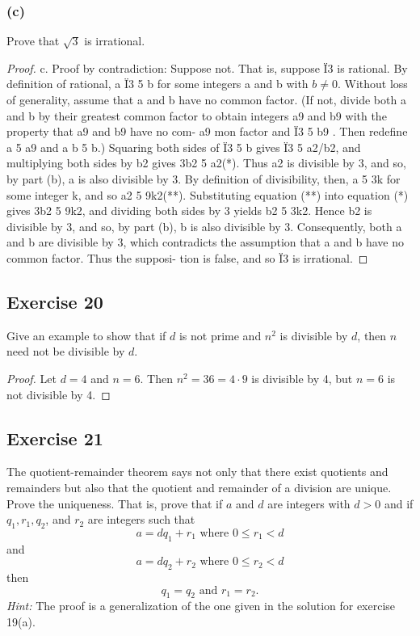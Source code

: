 \documentclass[14pt]{extarticle}
\begin{document}
\subsubsection{(c)}
Prove that $\sqrt{3}$ is irrational.

\begin{proof}
c. Proof by contradiction: Suppose not. That is,
suppose Ï3 is rational. By definition of rational,
a
Ï3 5 b for some integers a and b with $b \neq 0$.
Without loss of generality, assume that a and b have
no common factor. (If not, divide both a and b by
their greatest common factor to obtain integers a9
and b9 with the property that a9 and b9 have no com-
a9
mon factor and Ï3 5 b9 . Then redefine a 5 a9 and
a
b 5 b.) Squaring both sides of Ï3 5 b gives Ï3 5
a2/b2, and multiplying both sides by b2 gives
3b2 5 a2(*).
Thus a2 is divisible by 3, and so, by part (b), a is
also divisible by 3. By definition of divisibility, then,
a 5 3k for some integer k, and so
a2 5 9k2(**).
Substituting equation (**) into equation (*) gives
3b2 5 9k2, and dividing both sides by 3 yields
b2 5 3k2.
Hence b2 is divisible by 3, and so, by part (b), b is
also divisible by 3. Consequently, both a and b are
divisible by 3, which contradicts the assumption that
a and b have no common factor. Thus the supposi-
tion is false, and so Ï3 is irrational.
\end{proof}

\subsection{Exercise 20}
Give an example to show that if $d$ is not prime and $n^2$ is divisible by $d$, then $n$ need not be divisible by $d$.

\begin{proof}
Let $d = 4$ and $n = 6$. Then $n^2 = 36 = 4 \cdot 9$ is divisible by 4, but $n = 6$ is not divisible by 4.
\end{proof}

\subsection{Exercise 21}
The quotient-remainder theorem says not only that there exist quotients and remainders but also that the quotient and remainder of a division are unique. Prove the uniqueness. That is, prove that if $a$ and $d$ are integers with $d > 0$ and if $q_1, r_1, q_2$, and $r_2$ are integers such that
\[
a = dq_1 + r_1 \text{ where } 0 \leq r_1 < d
\]
and
\[
a = dq_2 + r_2 \text{ where } 0 \leq r_2 < d
\]
then
\[
q_1 = q_2 \text{ and } r_1 = r_2.
\]
{\it Hint:} The proof is a generalization of the one given in the solution for exercise 19(a).
\end{document}
